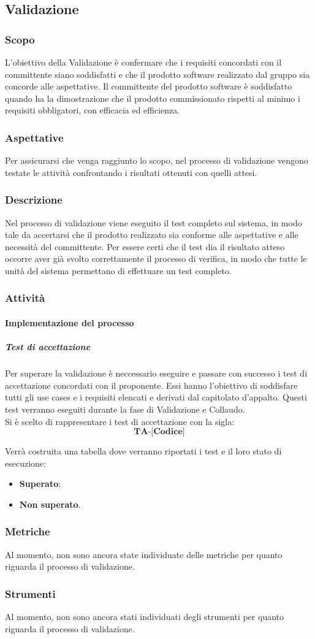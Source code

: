 \subsection{Validazione}
\subsubsection{Scopo}
L’obiettivo della Validazione è confermare che i requisiti concordati con il committente siano soddisfatti e che il prodotto software realizzato dal gruppo sia concorde alle aspettative.
Il committente del prodotto software è soddisfatto quando ha la dimostrazione che il prodotto commissionato rispetti al minimo i requisiti obbligatori, con efficacia ed efficienza.
\subsubsection{Aspettative}
Per assicurarsi che venga raggiunto lo scopo, nel processo di validazione vengono testate le attività confrontando i risultati ottenuti con quelli attesi.
\subsubsection{Descrizione}
Nel processo di validazione viene eseguito il test completo sul sistema, in modo tale da accertarsi che il prodotto realizzato sia conforme alle aspettative e alle necessità del committente. 
Per essere certi che il test dia il risultato atteso occorre aver già svolto correttamente il processo di verifica, in modo che tutte le unità del sistema permettano di effettuare un test completo.
\subsubsection{Attività}
\paragraph{Implementazione del processo}
\subparagraph*{Test di accettazione}
Per superare la validazione è neccessario eseguire e passare con successo i test di accettazione concordati con il proponente. Essi hanno l'obiettivo di soddisfare tutti gli use cases e i requisiti elencati e derivati dal capitolato d'appalto. Questi test verranno eseguiti durante la fase di Validazione e Collaudo.\\
Si è scelto di rappresentare i test di accettazione con la sigla:
$$\textbf{TA-[Codice]}$$

Verrà costruita una tabella dove verranno riportati i test e il loro stato di esecuzione:
\begin{itemize}
\item	\textbf{Superato};
\item	\textbf{Non superato}.
\end{itemize}
\subsubsection{Metriche}
Al momento, non sono ancora state individuate delle metriche per quanto riguarda il processo di validazione.
\subsubsection{Strumenti}
Al momento, non sono ancora stati individuati degli strumenti per quanto riguarda il processo di validazione.
